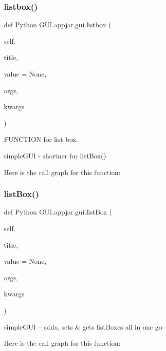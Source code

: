\subsubsection{\texorpdfstring{listbox()}{listbox()}}
{\footnotesize\ttfamily def Python G\+U\+I.\+appjar.\+gui.\+listbox (\begin{DoxyParamCaption}\item[{}]{self,  }\item[{}]{title,  }\item[{}]{value = {\ttfamily None},  }\item[{}]{args,  }\item[{}]{kwargs }\end{DoxyParamCaption})}



F\+U\+N\+C\+T\+I\+ON for list box. 

\begin{DoxyVerb}simpleGUI - shortner for listBox() \end{DoxyVerb}
 Here is the call graph for this function\+:
\mbox{\label{class_python_01_g_u_i_1_1appjar_1_1gui_a682bc60268b1ea9ad1e4eb4a2afce292}} 
\subsubsection{\texorpdfstring{list\+Box()}{listBox()}}
{\footnotesize\ttfamily def Python G\+U\+I.\+appjar.\+gui.\+list\+Box (\begin{DoxyParamCaption}\item[{}]{self,  }\item[{}]{title,  }\item[{}]{value = {\ttfamily None},  }\item[{}]{args,  }\item[{}]{kwargs }\end{DoxyParamCaption})}

\begin{DoxyVerb}simpleGUI -- adds, sets & gets listBoxes all in one go \end{DoxyVerb}
 Here is the call graph for this function\+:
\mbox{\label{class_python_01_g_u_i_1_1appjar_1_1gui_a22f0678a46f3eb1bf27a78562425d275}} 
